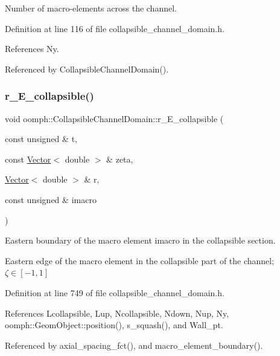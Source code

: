 Number of macro-\/elements across the channel. 



Definition at line 116 of file collapsible\+\_\+channel\+\_\+domain.\+h.



References Ny.



Referenced by Collapsible\+Channel\+Domain().

\mbox{\label{classoomph_1_1CollapsibleChannelDomain_af684e8e3271ed8f599a02495f794c4e8}} 
\subsubsection{\texorpdfstring{r\+\_\+\+E\+\_\+collapsible()}{r\_E\_collapsible()}}
{\footnotesize\ttfamily void oomph\+::\+Collapsible\+Channel\+Domain\+::r\+\_\+\+E\+\_\+collapsible (\begin{DoxyParamCaption}\item[{const unsigned \&}]{t,  }\item[{const \hyperlink{classoomph_1_1Vector}{Vector}$<$ double $>$ \&}]{zeta,  }\item[{\hyperlink{classoomph_1_1Vector}{Vector}$<$ double $>$ \&}]{r,  }\item[{const unsigned \&}]{imacro }\end{DoxyParamCaption})\hspace{0.3cm}{\ttfamily [private]}}



Eastern boundary of the macro element imacro in the collapsible section. 

Eastern edge of the macro element in the collapsible part of the channel; $ \zeta \in [-1,1] $ 

Definition at line 749 of file collapsible\+\_\+channel\+\_\+domain.\+h.



References Lcollapsible, Lup, Ncollapsible, Ndown, Nup, Ny, oomph\+::\+Geom\+Object\+::position(), s\+\_\+squash(), and Wall\+\_\+pt.



Referenced by axial\+\_\+spacing\+\_\+fct(), and macro\+\_\+element\+\_\+boundary().

